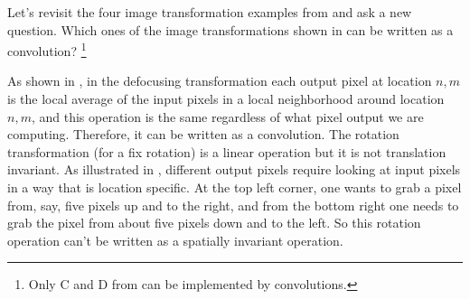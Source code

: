 %
%

Let's revisit the four image transformation examples from \fig{\ref{fig:transformationsquizz}} and ask a new question. Which ones of the image transformations shown in \fig{\ref{fig:transformationsquizz}} can be written as a convolution?
\footnote{Only C and D from \fig{\ref{fig:transformationsquizz}} can be implemented by convolutions.}%

As shown in , in the defocusing transformation each output pixel at location $n,m$ is the local average of the input pixels in a local neighborhood around location $n,m$, and this operation is the same regardless of what pixel output we are computing. Therefore, it can be written as a convolution. The rotation transformation (for a fix rotation) is a linear operation but it is not translation invariant. As illustrated in , different output pixels require looking at input pixels in a way that is location specific. At the top left corner, one wants to grab a pixel from, say, five pixels up and to the right, and from the bottom right one needs to grab the pixel from about five pixels down and to the left. So this rotation operation can't be written as a spatially invariant operation.

